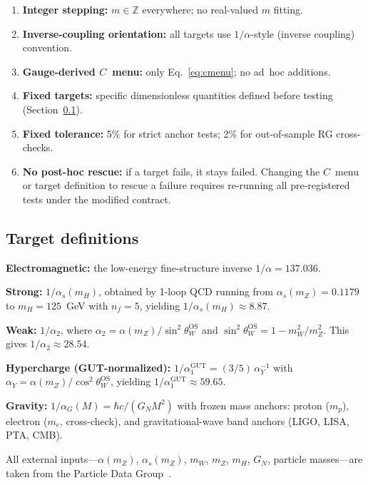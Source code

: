 \documentclass[12pt,a4paper]{article}
\newcommand{\mZ}{m_Z}
\begin{document}
\begin{enumerate}[nosep, label=\textbf{F\arabic*.}]
  \item \textbf{Integer stepping:} $m \in \mathbb{Z}$ everywhere; no
    real-valued $m$ fitting.
  \item \textbf{Inverse-coupling orientation:} all targets use
    $1/\alpha$-style (inverse coupling) convention.
  \item \textbf{Gauge-derived $C$~menu:} only Eq.~\eqref{eq:cmenu};
    no ad~hoc additions.
  \item \textbf{Fixed targets:} specific dimensionless quantities defined
    before testing (Section~\ref{sec:targets}).
  \item \textbf{Fixed tolerance:} 5\% for strict anchor tests; 2\% for
    out-of-sample RG cross-checks.
  \item \textbf{No post-hoc rescue:} if a target fails, it stays failed.
    Changing the $C$~menu or target definition to rescue a failure requires
    re-running all pre-registered tests under the modified contract.
\end{enumerate}

\subsection{Target definitions}
\label{sec:targets}

\textbf{Electromagnetic:} the low-energy fine-structure inverse
$1/\alpha = 137.036$.

\textbf{Strong:} $1/\alpha_s(m_H)$, obtained by 1-loop QCD running from
$\alpha_s(\mZ) = 0.1179$ to $m_H = 125$~GeV with $n_f = 5$, yielding
$1/\alpha_s(m_H) \approx 8.87$.

\textbf{Weak:} $1/\alpha_2$, where $\alpha_2 = \alpha(\mZ)/\sin^2\theta_W^{\mathrm{OS}}$
and $\sin^2\theta_W^{\mathrm{OS}} = 1 - m_W^2/m_Z^2$.  This gives
$1/\alpha_2 \approx 28.54$.

\textbf{Hypercharge (GUT-normalized):}
$1/\alpha_1^{\mathrm{GUT}} = (3/5)\,\alpha_Y^{-1}$
with $\alpha_Y = \alpha(\mZ)/\cos^2\theta_W^{\mathrm{OS}}$, yielding
$1/\alpha_1^{\mathrm{GUT}} \approx 59.65$.

\textbf{Gravity:} $1/\alpha_G(M) = \hbar c/(G_N M^2)$ with frozen mass
anchors: proton ($m_p$), electron ($m_e$, cross-check), and
gravitational-wave band anchors (LIGO, LISA, PTA, CMB).

All external inputs---$\alpha(\mZ)$, $\alpha_s(\mZ)$, $m_W$, $m_Z$,
$m_H$, $G_N$, particle masses---are taken from the Particle Data
Group~\cite{pdg2024}.
\end{document}
